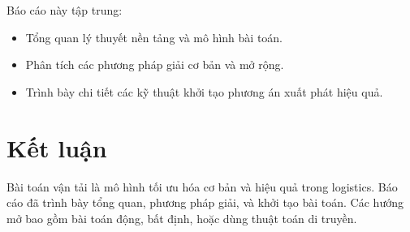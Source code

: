 \documentclass[oneside, a4paper]{book} %
\theoremstyle{plain}
\theoremstyle{definition}
\theoremstyle{remark}
\renewcommand{\thesection}{\arabic{chapter}.\arabic{section}}
\begin{document}
Báo cáo này tập trung:
\begin{itemize}
    \item Tổng quan lý thuyết nền tảng và mô hình bài toán.
    \item Phân tích các phương pháp giải cơ bản và mở rộng.
    \item Trình bày chi tiết các kỹ thuật khởi tạo phương án xuất phát hiệu quả.
\end{itemize}


\clearpage


\clearpage


\clearpage

\chapter{Kết luận}
Bài toán vận tải là mô hình tối ưu hóa cơ bản và hiệu quả trong logistics. Báo cáo đã trình bày tổng quan, phương pháp giải, và khởi tạo bài toán. Các hướng mở bao gồm bài toán động, bất định, hoặc dùng thuật toán di truyền.



\end{document}
